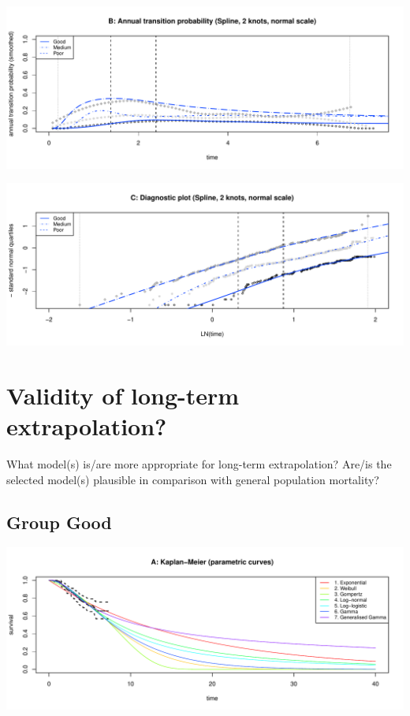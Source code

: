 \documentclass[]{article}
\begin{document}
\begin{flushleft}\includegraphics[height=0.3\textheight]{images/spline_norm2-2} \end{flushleft}

\begin{flushleft}\includegraphics[height=0.3\textheight]{images/spline_norm2-3} \end{flushleft}

\newpage

\section{Validity of long-term
extrapolation?}\label{validity-of-long-term-extrapolation}

What model(s) is/are more appropriate for long-term extrapolation?
Are/is the selected model(s) plausible in comparison with general
population mortality?

\subsection{Group Good}\label{group-good}

\begin{flushleft}\includegraphics[height=0.29\textheight]{images/validate_extrapolation1-1} \end{flushleft}
\end{document}
